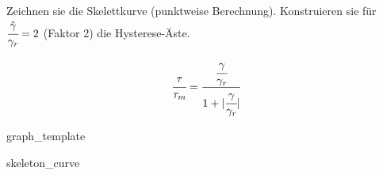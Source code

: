 \begin{questions}
\vspace{1em}
    \begin{tasks}
        \task[] Zeichnen sie die Skelettkurve (punktweise Berechnung).
        \task[] Konstruieren sie für $\cfrac{\hat \gamma}{\gamma_r}=2$ (Faktor 2) die Hysterese-Äste.
    \end{tasks}

    \begin{align*}
        \cfrac{\tau}{\tau_m} = \cfrac{\cfrac{\gamma}{\gamma_r}}{1+|\cfrac{\gamma}{\gamma_r}|}
    \end{align*}

    graph\_template


    \begin{solution}
        skeleton\_curve

    \end{solution}
    
\end{questions}
